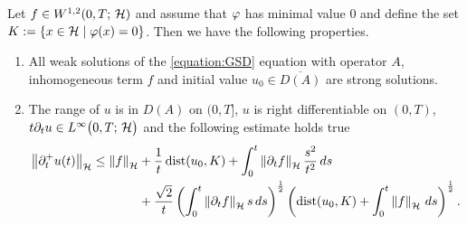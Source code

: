 \begin{theorem}\label{theorem:SGD prop of sub diff with f in w11}
	Let $ f\in W^{1,2}(0,T;\,\mathcal{H}) $ and 
	assume that $ \varphi $ has minimal value $ 0 $ and define the
	set $ K:=\{x\in\mathcal{H}\;\vert\; \varphi(x)=0\} $. Then we have
	the following properties. 
	\begin{enumerate}[label=(\roman*)]
		\item All weak solutions of the \ref{equation:GSD}
		equation with operator $ A $, inhomogeneous term  $ f $ and initial 
		value $ u_0\in \overline{D(A)} $ are strong solutions.
		\item The range of $ u$ is in $ D(A) $ 
		on $ (0,T] $, $ u $ is right differentiable
		on $ (0,T) $, $ t\partial_t u\in L^{\infty}\big(0,T;\,\mathcal{H}\big) $ and
		the following estimate holds true
		\begin{align}\label{equation:SGD of sub diff with f in w11 energy bound der}
			\begin{split}
				\left\Vert \partial_t^+ u(t)\right\Vert_{\mathcal{H}}
				\leq \left\Vert f\right\Vert_{\mathcal{H}}
				&+\frac{1}{t}\operatorname{\mathrm{dist}}(u_0, K)
				+\int_0^t\left\Vert \partial_t f\right\Vert_{\mathcal{H}}\frac{s^2}{t^2}\,ds\\
				&+\frac{\sqrt{2}}{t}
				\left(\int_0^t\left\Vert \partial_t f\right\Vert_{\mathcal{H}} s\,ds\right)^{\frac{1}{2}}
				\left(\operatorname{\mathrm{dist}}(u_0,K)+\int_0^t\left\Vert f\right\Vert_{\mathcal{H}}\,ds\right)^{\frac{1}{2}}.
			\end{split}
		\end{align}
	\end{enumerate}
\end{theorem}
